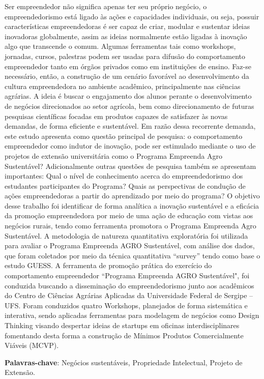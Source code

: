 \setlength{\absparsep}{18pt} %
\begin{resumo}


Ser empreendedor não significa apenas ter seu próprio negócio, o empreendedorismo está ligado às ações e capacidades individuais, ou seja, possuir características empreendedoras é ser capaz de criar, modular e sustentar ideias inovadoras globalmente, assim as ideias normalmente estão ligadas à inovação algo que transcende o comum. Algumas ferramentas tais como workshops, jornadas, cursos, palestras podem ser usadas para difusão do comportamento empreendedor tanto em órgãos privados como em instituições de ensino. Faz-se necessário, então, a construção de um cenário favorável ao desenvolvimento da cultura empreendedora no ambiente acadêmico, principalmente nas ciências agrárias. A ideia é buscar o engajamento dos alunos perante o desenvolvimento de negócios direcionados ao setor agrícola, bem como direcionamento de futuras pesquisas científicas focadas em produtos capazes de satisfazer às novas demandas, de forma eficiente e sustentável. Em razão dessa recorrente demanda, este estudo apresenta como questão principal de pesquisa: o comportamento empreendedor como indutor de inovação, pode ser estimulado mediante o uso de projetos de extensão universitária como o Programa Empreenda Agro Sustentável? Adicionalmente outras questões de pesquisa também se apresentam importantes:
Qual o nível de conhecimento acerca do empreendedorismo dos estudantes participantes do Programa? Quais as perspectivas de condução de ações empreendedoras a partir do aprendizado por meio do programa? O objetivo desse trabalho foi identificar de forma analítica a inovação sustentável e a eficácia da promoção empreendedora por meio de uma ação de educação com vistas aos negócios rurais, tendo como ferramenta promotora o Programa Empreenda Agro Sustentável. A metodologia de natureza quantitativa exploratória foi utilizada para avaliar o Programa Empreenda AGRO Sustentável, com análise dos dados, que foram coletados por meio da técnica quantitativa “survey” tendo como base o estudo GUESS. A ferramenta de promoção prática do exercício do comportamento empreendedor “Programa Empreenda AGRO Sustentável", foi conduzida buscando a disseminação do empreendedorismo junto aos acadêmicos do Centro de Ciências Agrárias Aplicadas da Universidade Federal de Sergipe – UFS. Foram conduzidos quatro Workshops, planejados de forma sistemática e interativa, sendo aplicadas ferramentas para modelagem de negócios como Design Thinking visando despertar ideias de startups em oficinas interdisciplinares fomentando desta forma a construção de Mínimos Produtos Comercialmente Viáveis (MCVP).



 \textbf{Palavras-chave}: Negócios sustentáveis, Propriedade Intelectual, Projeto de Extensão.
\end{resumo}